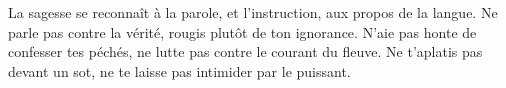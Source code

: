 La sagesse se reconnaît à la parole,
	et l’instruction, aux propos de la langue.
Ne parle pas contre la vérité,
	rougis plutôt de ton ignorance.
N’aie pas honte de confesser tes péchés,
	ne lutte pas contre le courant du fleuve.
Ne t’aplatis pas devant un sot,
	ne te laisse pas intimider par le puissant.
